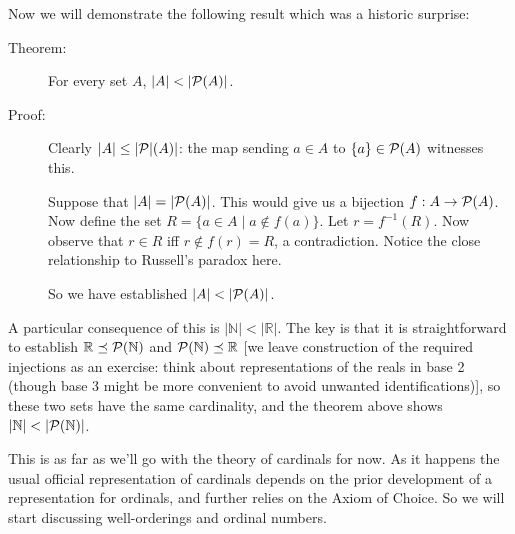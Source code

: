 \documentclass[12pt]{book}
\begin{document}
Now we will demonstrate the following result which was a historic surprise:

\begin{description}

\item[Theorem:]  For every set $A$, $|A| < |{\cal P}(A)|$.

\item[Proof:]  Clearly $|A| \leq |{\cal P}|(A)|$:  the map sending $a \in A$ to $\{a\} \in {\cal P}(A)$ witnesses this.

Suppose that $|A|=|{\cal P}(A)|$.  This would give us a bijection $f:A \rightarrow {\cal P}(A)$.  Now define the set $R = \{a \in A \mid a \not\in f(a)\}$.  Let $r = f^{-1}(R)$.  Now observe that $r \in R$ iff $r \not\in f(r)=R$, a contradiction.  Notice the close relationship to Russell's paradox here.

So we have established $|A|<|{\cal P}(A)|$.

\end{description}

A particular consequence of this is $|\mathbb N|<|\mathbb R|$.  The key is that it is straightforward to establish $\mathbb R \preceq {\cal P}(\mathbb N)$ and ${\cal P}(\mathbb N) \preceq \mathbb R$ [we leave construction of the required injections as an exercise:  think about representations of the reals in base 2 (though base 3 might be more convenient to avoid unwanted identifications)], so these two sets have the same cardinality, and the theorem above shows $|\mathbb N|<|{\cal P}(\mathbb N)|$.

This is as far as we'll go with the theory of cardinals for now.  As it happens the usual official representation of cardinals depends on the prior development of a representation for ordinals, and further relies on the Axiom of Choice.  So we will start discussing well-orderings and ordinal numbers.
\end{document}
